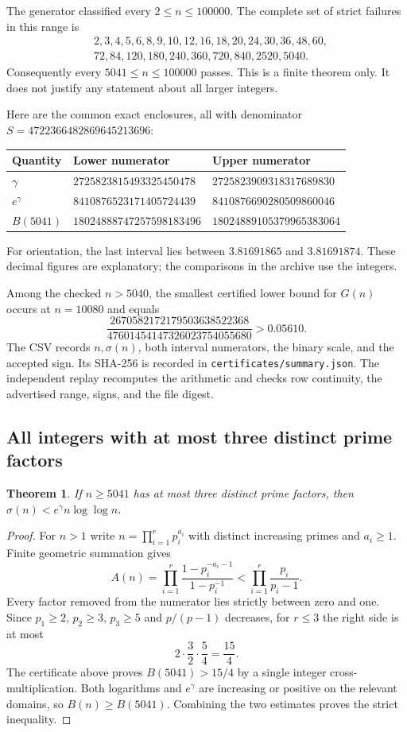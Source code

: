 \documentclass[11pt,a4paper]{article}
\newtheorem{theorem}{Theorem}[section]
\theoremstyle{definition}
\newcommand{\code}[1]{\texttt{\small #1}}
\begin{document}
The generator classified every $2\le n\le100000$. The complete set of
strict failures in this range is
\begin{align*}
 &2,3,4,5,6,8,9,10,12,16,18,20,24,30,36,48,60,\\
 &72,84,120,180,240,360,720,840,2520,5040.
\end{align*}
Consequently every $5041\le n\le100000$ passes. This is a finite theorem
only. It does not justify any statement about all larger integers.

Here are the common exact enclosures, all with denominator
$S=4722366482869645213696$:
\begin{center}
\small
\begin{tabular}{@{}lll@{}}
\toprule
Quantity & Lower numerator & Upper numerator\\
\midrule
$\gamma$ & $2725823815493325450478$ & $2725823909318317689830$\\
$e^\gamma$ & $8410876523171405724439$ & $8410876690280509860046$\\
$B(5041)$ & $18024888747257598183496$ & $18024889105379965383064$\\
\bottomrule
\end{tabular}
\end{center}
For orientation, the last interval lies between $3.81691865$ and
$3.81691874$. These decimal figures are explanatory; the comparisons
in the archive use the integers.

Among the checked $n>5040$, the smallest certified lower bound for
$G(n)$ occurs at $n=10080$ and equals
\[
 \frac{2670582172179503638522368}
      {47601454147326023754055680}
 >0.05610.
\]
The CSV records $n,\sigma(n)$, both interval numerators, the binary
scale, and the accepted sign. Its SHA-256 is recorded in
\code{certificates/summary.json}. The independent replay recomputes
the arithmetic and checks row continuity, the advertised range, signs,
and the file digest.

\subsection{All integers with at most three distinct prime factors}

\begin{theorem}\label{thm:three}
If $n\ge5041$ has at most three distinct prime factors, then
$\sigma(n)<e^\gamma n\log\log n$.
\end{theorem}
\begin{proof}
For $n>1$ write $n=\prod_{i=1}^r p_i^{a_i}$ with distinct increasing
primes and $a_i\ge1$. Finite geometric summation gives
\[
 A(n)=\prod_{i=1}^r
       \frac{1-p_i^{-a_i-1}}{1-p_i^{-1}}
 <\prod_{i=1}^r\frac{p_i}{p_i-1}.
\]
Every factor removed from the numerator lies strictly between zero and
one. Since $p_1\ge2$, $p_2\ge3$, $p_3\ge5$ and $p/(p-1)$ decreases,
for $r\le3$ the right side is at most
\[
 2\cdot\frac32\cdot\frac54=\frac{15}4.
\]
The certificate above proves $B(5041)>15/4$ by a single integer
cross-multiplication. Both logarithms and $e^\gamma$ are increasing
or positive on the relevant domains, so $B(n)\ge B(5041)$.
Combining the two estimates proves the strict inequality.
\end{proof}
\end{document}
